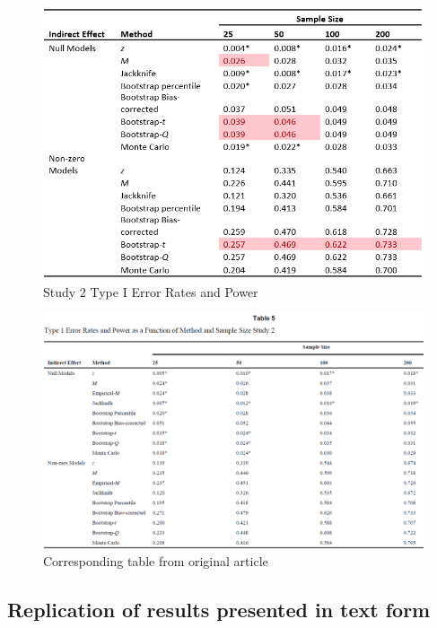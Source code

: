 \documentclass[10,a4paperpaper,]{article}
\newcommand{\blandscape}{\begin{landscape}}
\newcommand{\elandscape}{\end{landscape}}
\begin{document}
\newpage

\blandscape

\begin{figure}
\centering
\includegraphics[width=1.00000\textwidth]{RepliSimsTable5.PNG}
\caption{Study 2 Type I Error Rates and Power}
\end{figure}

\begin{figure}
\includegraphics[width=1\linewidth]{RepliSimsMacKinnonTable5} \caption{Corresponding table from original article}\label{fig:unnamed-chunk-9}
\end{figure}

\elandscape

\newpage

\subsection{Replication of results presented in text form }
\end{document}
